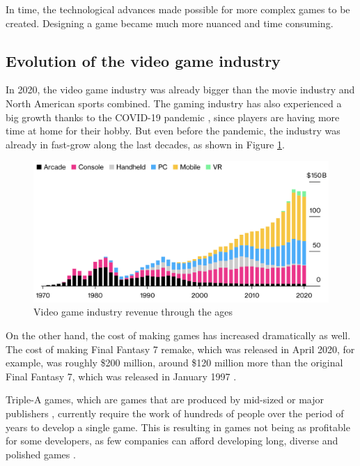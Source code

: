 In time, the technological advances made possible for more complex games to be created. Designing a game became much more nuanced and time consuming. 

\subsection{Evolution of the video game industry}

In 2020, the video game industry was already bigger than the movie industry and North American sports combined. The gaming industry has also experienced a big growth thanks to the COVID-19 pandemic \cite{marketwatch:2019}, since players are having more time at home for their hobby. But even before the pandemic, the industry was already in fast-grow along the last decades, as shown in Figure \ref{fig:growth_graph}.

\begin{figure}[h]
    \caption{Video game industry revenue through the ages}
    \centerline{\includegraphics[width=13cm]{images/introduction/industry_growth.png}}
    \label{fig:growth_graph}
\end{figure}

On the other hand, the cost of making games has increased dramatically as well. The cost of making Final Fantasy 7 remake, which was released in April 2020, for example, was roughly \$200 million, around \$120 million more than the original Final Fantasy 7, which was released in January 1997 \cite{cbr:2021}.

Triple-A games, which are games that are produced by mid-sized or major publishers \cite{steinberg:2007}, currently require the work of hundreds of people over the period of years to develop a single game. This is resulting in games not being as profitable for some developers, as few companies can afford developing long, diverse and polished games \cite{shaker:2016}.

